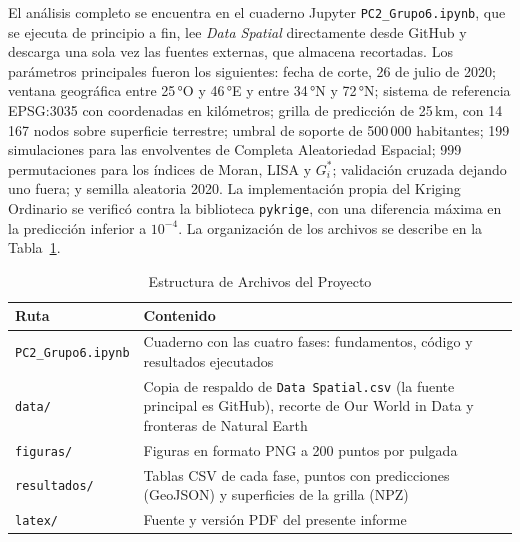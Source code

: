 \documentclass[12pt,a4paper]{article}
\newcommand{\nota}[1]{\par\vspace{4pt}{\setstretch{1}\small\raggedright\textit{Nota.} #1\par}}
\begin{document}
El análisis completo se encuentra en el cuaderno Jupyter \texttt{PC2\_Grupo6.ipynb}, que se ejecuta de principio a fin, lee \emph{Data Spatial} directamente desde GitHub y descarga una sola vez las fuentes externas, que almacena recortadas. Los parámetros principales fueron los siguientes: fecha de corte, 26 de julio de 2020; ventana geográfica entre 25\,°O y 46\,°E y entre 34\,°N y 72\,°N; sistema de referencia EPSG:3035 con coordenadas en kilómetros; grilla de predicción de 25\,km, con 14\,167 nodos sobre superficie terrestre; umbral de soporte de 500\,000 habitantes; 199 simulaciones para las envolventes de Completa Aleatoriedad Espacial; 999 permutaciones para los índices de Moran, LISA y $G_i^*$; validación cruzada dejando uno fuera; y semilla aleatoria 2020. La implementación propia del Kriging Ordinario se verificó contra la biblioteca \texttt{pykrige}, con una diferencia máxima en la predicción inferior a $10^{-4}$. La organización de los archivos se describe en la Tabla~\ref{tab:archivos}.

\begin{table}[H]\centering{}\small
\caption{Estructura de Archivos del Proyecto}\label{tab:archivos}
\begin{tabularx}{\linewidth}{lX}\toprule
Ruta & Contenido\\\midrule
\texttt{PC2\_Grupo6.ipynb} & Cuaderno con las cuatro fases: fundamentos, código y resultados ejecutados\\
\texttt{data/} & Copia de respaldo de \texttt{Data Spatial.csv} (la fuente principal es GitHub), recorte de Our World in Data y fronteras de Natural Earth\\
\texttt{figuras/} & Figuras en formato PNG a 200 puntos por pulgada\\
\texttt{resultados/} & Tablas CSV de cada fase, puntos con predicciones (GeoJSON) y superficies de la grilla (NPZ)\\
\texttt{latex/} & Fuente y versión PDF del presente informe\\\bottomrule
\end{tabularx}
\nota{Elaboración propia.}
\end{table}
\end{document}
